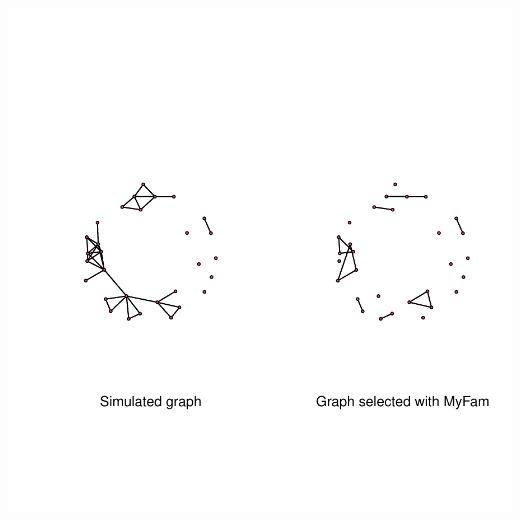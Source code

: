 \documentclass[noinfoline]{imsart}
\begin{document}
\includegraphics{Notice-explotMyFam}





%



\end{document}
